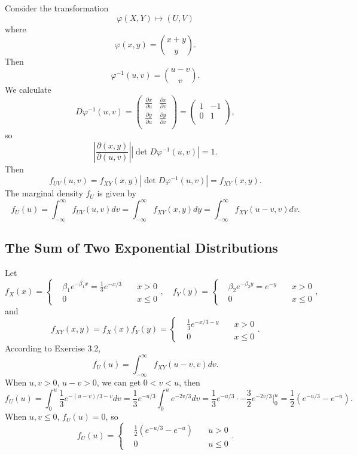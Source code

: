 \documentclass[11pt,a4paper]{article}
\begin{document}
Consider the transformation 
$$\varphi(X,Y)\mapsto (U,V)$$
where
$$\varphi(x,y)=\binom{x+y}{y}.$$
Then
$$\varphi^{-1}(u,v)=\binom{u-v}{v}.$$
We calculate
$$D\varphi^{-1}(u,v)=\begin{pmatrix}
\frac{\partial x}{\partial u} & \frac{\partial x}{\partial v} \\
\frac{\partial y}{\partial u} & \frac{\partial y}{\partial v} \\
\end{pmatrix}=\begin{pmatrix}
1 & -1 \\ 0 & 1 \\
\end{pmatrix},$$
so
$$\left|\frac{\partial(x,y)}{\partial(u,v)}\right||\det D\varphi^{-1}(u,v)|=1.$$
Then
$$f_{UV}(u,v)=f_{XY}(x,y)|\det D\varphi^{-1}(u,v)|=f_{XY}(x,y).$$
The marginal density $f_U$ is given by
$$f_U(u)=\int_{-\infty}^\infty f_{UV}(u,v)dv=\int_{-\infty}^\infty f_{XY}(x,y)dy=\int_{-\infty}^\infty f_{XY}(u-v,v)dv.$$

\subsection{The Sum of Two Exponential Distributions}
Let
$$f_X(x)=\left\{\begin{aligned}
&\beta_1e^{-\beta_1x}=\frac{1}{3}e^{-x/3} &\quad x>0 \\
&0 &\quad x\leqslant 0
\end{aligned}\right.,\quad
f_Y(y)=\left\{\begin{aligned}
&\beta_2e^{-\beta_2y}=e^{-y} &\quad x>0 \\
&0 &\quad x\leqslant 0
\end{aligned}\right.,$$
and
$$f_{XY}(x,y)=f_X(x)f_Y(y)=\left\{\begin{aligned}
&\frac{1}{3}e^{-x/3-y} &\quad x>0 \\
&0 &\quad x\leqslant 0
\end{aligned}\right..$$
According to Exercise 3.2,
$$f_U(u)=\int_{-\infty}^\infty f_{XY}(u-v,v)dv.$$
When $u,v>0$, $u-v>0$, we can get $0<v<u$, then
$$f_U(u)=\int_0^u\frac{1}{3}e^{-(u-v)/3-v}dv=\frac{1}{3}e^{-u/3}\int_0^u e^{-2v/3}dv=\frac{1}{3}e^{-u/3}\cdot-\frac{3}{2}e^{-2v/3}\bigg|_0^u=\frac{1}{2}(e^{-u/3}-e^{-u}).$$
When $u,v\leqslant0$, $f_U(u)=0$, so
$$f_U(u)=\left\{\begin{aligned}
&\frac{1}{2}(e^{-u/3}-e^{-u}) &\quad u>0 \\
&0 &\quad u\leqslant 0
\end{aligned}\right..$$
\end{document}
